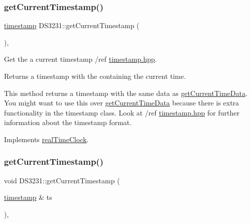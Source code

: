 \subsubsection{\texorpdfstring{get\+Current\+Timestamp()}{getCurrentTimestamp()}\hspace{0.1cm}{\footnotesize\ttfamily [1/2]}}
{\footnotesize\ttfamily \mbox{\hyperlink{classtimestamp}{timestamp}} D\+S3231\+::get\+Current\+Timestamp (\begin{DoxyParamCaption}{ }\end{DoxyParamCaption})\hspace{0.3cm}{\ttfamily [override]}, {\ttfamily [virtual]}}



Get the a current timestamp /ref \mbox{\hyperlink{timestamp_8hpp_source}{timestamp.\+hpp}}. 

\begin{DoxyReturn}{Returns}
a timestamp with the containing the current time.
\end{DoxyReturn}
This method returns a timestamp with the same data as \mbox{\hyperlink{class_d_s3231_a0ca41c2242367c5ff1424d1b12f909c5}{get\+Current\+Time\+Data}}. You might want to use this over \mbox{\hyperlink{class_d_s3231_a0ca41c2242367c5ff1424d1b12f909c5}{get\+Current\+Time\+Data}} because there is extra functionality in the timestamp class. Look at /ref \mbox{\hyperlink{timestamp_8hpp_source}{timestamp.\+hpp}} for further information about the timestamp format. 

Implements \mbox{\hyperlink{classreal_time_clock_a08a7854ef9cef638996a267a953c9b14}{real\+Time\+Clock}}.

\mbox{\label{class_d_s3231_ad94d54ed265fb5b911b4281f0103b0b0}} 
\subsubsection{\texorpdfstring{get\+Current\+Timestamp()}{getCurrentTimestamp()}\hspace{0.1cm}{\footnotesize\ttfamily [2/2]}}
{\footnotesize\ttfamily void D\+S3231\+::get\+Current\+Timestamp (\begin{DoxyParamCaption}\item[{\mbox{\hyperlink{classtimestamp}{timestamp}} \&}]{ts }\end{DoxyParamCaption})\hspace{0.3cm}{\ttfamily [override]}, {\ttfamily [virtual]}}



